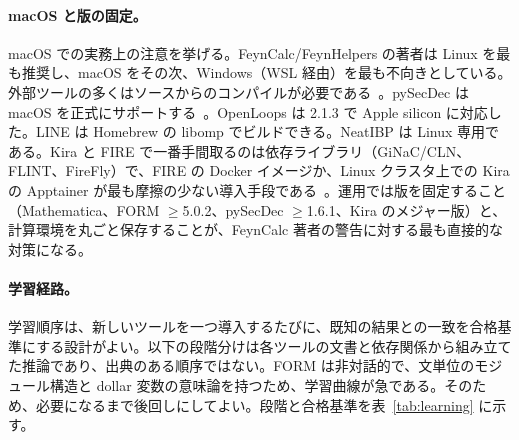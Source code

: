 \documentclass[a4paper,10pt]{ltjsarticle}
\begin{document}
\paragraph{macOS と版の固定。}macOS での実務上の注意を挙げる。FeynCalc/FeynHelpers の著者は Linux を最も推奨し、macOS をその次、Windows（WSL 経由）を最も不向きとしている。外部ツールの多くはソースからのコンパイルが必要である~\cite{r10}。pySecDec は macOS を正式にサポートする~\cite{r90}。OpenLoops は 2.1.3 で Apple silicon に対応した。LINE は Homebrew の libomp でビルドできる。NeatIBP は Linux 専用である。Kira と FIRE で一番手間取るのは依存ライブラリ（GiNaC/CLN、FLINT、FireFly）で、FIRE の Docker イメージか、Linux クラスタ上での Kira の Apptainer が最も摩擦の少ない導入手段である~\cite{r76,r75}。運用では版を固定すること（Mathematica、FORM $\geq$5.0.2、pySecDec $\geq$1.6.1、Kira のメジャー版）と、計算環境を丸ごと保存することが、FeynCalc 著者の警告に対する最も直接的な対策になる。

\paragraph{学習経路。}学習順序は、新しいツールを一つ導入するたびに、既知の結果との一致を合格基準にする設計がよい。以下の段階分けは各ツールの文書と依存関係から組み立てた推論であり、出典のある順序ではない。FORM は非対話的で、文単位のモジュール構造と dollar 変数の意味論を持つため、学習曲線が急である。そのため、必要になるまで後回しにしてよい。段階と合格基準を表~\ref{tab:learning} に示す。
\end{document}
